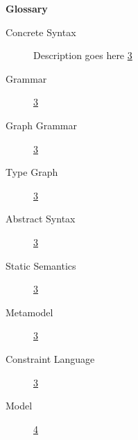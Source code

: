 
\vspace*{2cm}

{\bf \huge Glossary}

\vspace{0.5cm}

\begin{description}

\item[Concrete Syntax] Description goes here \hfill \hyperlink{page.3}{3}

\item[Grammar] \hfill \hyperlink{page.3}{3}

\item[Graph Grammar] \hfill \hyperlink{page.3}{3}

\item[Type Graph] \hfill \hyperlink{page.3}{3}

\item[Abstract Syntax] \hfill \hyperlink{page.3}{3}

\item[Static Semantics] \hfill \hyperlink{page.3}{3}

\item[Metamodel] \hfill \hyperlink{page.3}{3}

\item[Constraint Language] \hfill \hyperlink{page.3}{3}

\item[Model] \hfill \hyperlink{page.4}{4}

\end{description}
